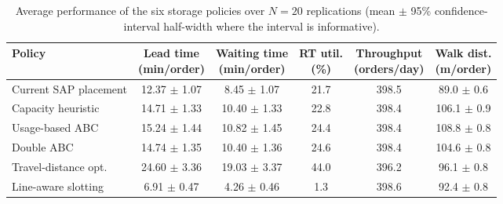 \begin{table}[htbp]
\centering
\caption{Average performance of the six storage policies over $N=20$ replications
(mean $\pm$ 95\% confidence-interval half-width where the interval is informative).}
\label{tab:kpi_summary}
\small
\begin{tabular}{lccccc}
\toprule
Policy & \makecell{Lead time\\(min/order)} & \makecell{Waiting time\\(min/order)} & \makecell{RT util.\\(\%)} & \makecell{Throughput\\(orders/day)} & \makecell{Walk dist.\\(m/order)} \\
\midrule
Current SAP placement & 12.37 $\pm$ 1.07 & 8.45 $\pm$ 1.07 & 21.7 & 398.5 & 89.0 $\pm$ 0.6 \\
Capacity heuristic & 14.71 $\pm$ 1.33 & 10.40 $\pm$ 1.33 & 22.8 & 398.4 & 106.1 $\pm$ 0.9 \\
Usage-based ABC & 15.24 $\pm$ 1.44 & 10.82 $\pm$ 1.45 & 24.4 & 398.4 & 108.8 $\pm$ 0.8 \\
Double ABC & 14.74 $\pm$ 1.35 & 10.40 $\pm$ 1.36 & 24.6 & 398.4 & 104.6 $\pm$ 0.8 \\
Travel-distance opt. & 24.60 $\pm$ 3.36 & 19.03 $\pm$ 3.37 & 44.0 & 396.2 & 96.1 $\pm$ 0.8 \\
Line-aware slotting & 6.91 $\pm$ 0.47 & 4.26 $\pm$ 0.46 & 1.3 & 398.6 & 92.4 $\pm$ 0.8 \\
\bottomrule
\end{tabular}
\end{table}
